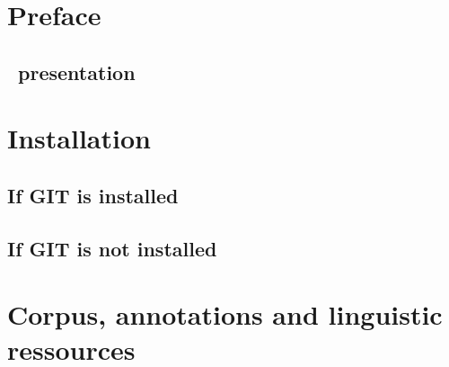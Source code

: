 \documentclass[12pt]{article}
\title{\SEMFull}
\date{}
\begin{document}
    \maketitle
    
    \tableofcontents
    \newpage
    
    \section{Preface}
    \label{sec:preface}
    
        \subsection{\SEM\ presentation}
        \label{subsec:presentation}
        
    
    \section{Installation}
    \label{sec:installation}
    

        \subsection{If GIT is installed}
        \label{ssubec:git-installed}
        

        \subsection{If GIT is not installed}
        \label{subsec:git-not-installed}
        

        \subsection{\Wapiti}
        \label{subsec:wapiti}
        
    
    \section{Corpus, annotations and linguistic ressources}
    \label{sec:corpus-annotations-resources}

        \subsection{\FTBFull}
        \label{subsec:ftb}
        
\end{document}
